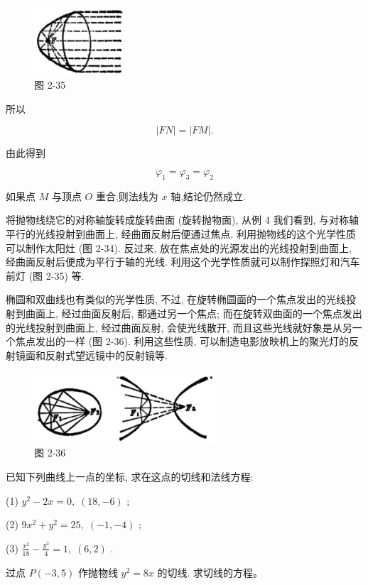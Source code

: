 \documentclass[lang=cn,newtx,10pt,scheme=chinese]{elegantbook}
\begin{document}
\begin{figure}[h]
  \centering
  \includegraphics[max width=0.3\textwidth]{images/01912cc2-ffb6-728e-9ae7-b113ff05c64b_123_478254.jpg}
  \caption{图 2-35}
\end{figure}



所以

\[
  \left| {FN}\right| = \left| {FM}\right| \text{.}
\]

由此得到

\[
    {\varphi }_{1} = {\varphi }_{3} = {\varphi }_{2}
\]

如果点 \(M\) 与顶点 \(O\) 重合,则法线为 \(x\) 轴,结论仍然成立.

将抛物线绕它的对称轴旋转成旋转曲面 (旋转抛物面), 从例 4 我们看到, 与对称轴平行的光线投射到曲面上, 经曲面反射后便通过焦点. 利用抛物线的这个光学性质可以制作太阳灶 (图 2-34). 反过来, 放在焦点处的光源发出的光线投射到曲面上, 经曲面反射后便成为平行于轴的光线. 利用这个光学性质就可以制作探照灯和汽车前灯 (图 2-35) 等.

椭圆和双曲线也有类似的光学性质, 不过, 在旋转椭圆面的一个焦点发出的光线投射到曲面上, 经过曲面反射后, 都通过另一个焦点; 而在旋转双曲面的一个焦点发出的光线投射到曲面上, 经过曲面反射, 会使光线散开, 而且这些光线就好象是从另一个焦点发出的一样 (图 2-36). 利用这些性质, 可以制造电影放映机上的聚光灯的反射镜面和反射式望远镜中的反射镜等.

\begin{figure}[h]
  \centering
  \includegraphics[max width=0.6\textwidth]{images/01912cc2-ffb6-728e-9ae7-b113ff05c64b_124_448954.jpg}
  \caption{图 2-36}
\end{figure}



\begin{problemset}[练习]

\item 已知下列曲线上一点的坐标, 求在这点的切线和法线方程:

(1) \({y}^{2} - {2x} = 0,\;\left( {{18}, - 6}\right)\) ;

(2) \(9{x}^{2} + {y}^{2} = {25},\;\left( {-1, - 4}\right)\) ;

(3) \(\frac{{x}^{2}}{18} - \frac{{y}^{2}}{4} = 1,\;\left( {6,2}\right)\) .

\item 过点 \(P\left( {-3,5}\right)\) 作抛物线 \({y}^{2} = {8x}\) 的切线. 求切线的方程。

\end{problemset}
\end{document}

